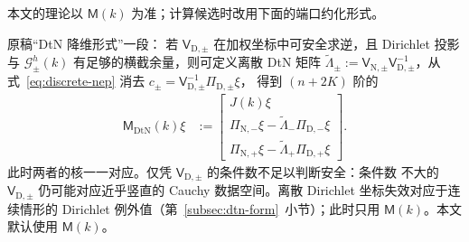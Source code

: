 本文的理论以 $\mathsf M(k)$ 为准；计算候选时改用下面的端口约化形式。

\begin{workonly}
原稿“DtN 降维形式”一段：
若 $\mathsf V_{\mathrm D,\pm}$ 在加权坐标中可安全求逆，且 Dirichlet 投影与
$\mathcal G^h_\pm(k)$ 有足够的横截余量，则可定义离散 DtN 矩阵
$\widetilde\Lambda_\pm:=\mathsf V_{\mathrm N,\pm}\mathsf V_{\mathrm D,\pm}^{-1}$，从
式~\eqref{eq:discrete-nep} 消去 $c_\pm=\mathsf V_{\mathrm D,\pm}^{-1}\Pi_{\mathrm D,\pm}\xi$，
得到 $(n+2K)$ 阶的
\begin{align}
  \mathsf M_{\mathrm{DtN}}(k)\xi
  &:=
  \begin{bmatrix}
    J(k)\xi\\
    \Pi_{\mathrm N,-}\xi-\widetilde\Lambda_-\Pi_{\mathrm D,-}\xi\\
    \Pi_{\mathrm N,+}\xi-\widetilde\Lambda_+\Pi_{\mathrm D,+}\xi
  \end{bmatrix}.
\end{align}
此时两者的核一一对应。仅凭 $\mathsf V_{\mathrm D,\pm}$ 的条件数不足以判断安全：条件数
不大的 $\mathsf V_{\mathrm D,\pm}$ 仍可能对应近乎竖直的 Cauchy 数据空间。离散 Dirichlet
坐标失效对应于连续情形的 Dirichlet 例外值（第~\ref{subsec:dtn-form}~小节）；此时只用
$\mathsf M(k)$。本文默认使用 $\mathsf M(k)$。
\end{workonly}

